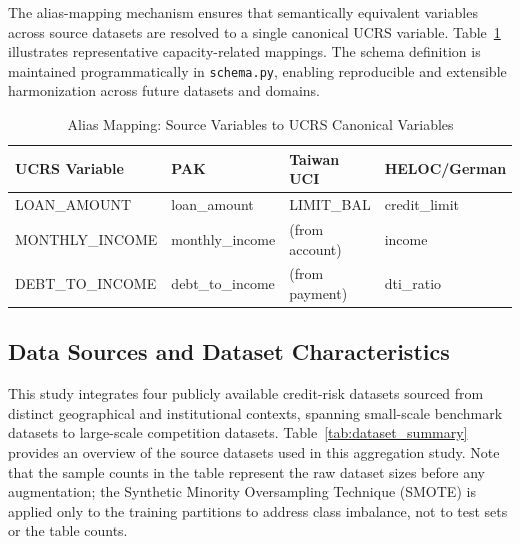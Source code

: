 \documentclass[onecolumn]{IEEEtai}
\begin{document}
The alias-mapping mechanism ensures that semantically equivalent variables across source datasets are resolved to a single canonical UCRS variable. Table~\ref{tab:alias_example} illustrates representative capacity-related mappings. The schema definition is maintained programmatically in \texttt{schema.py}, enabling reproducible and extensible harmonization across future datasets and domains.

\begin{table}[!htbp]
\centering
\small
\caption{Alias Mapping: Source Variables to UCRS Canonical Variables}
\label{tab:alias_example}
\begin{tabular}{llll}
\toprule
\textbf{UCRS Variable} & \textbf{PAK} & \textbf{Taiwan UCI} & \textbf{HELOC/German} \\
\midrule
LOAN\_AMOUNT     & loan\_amount   & LIMIT\_BAL      & credit\_limit \\
MONTHLY\_INCOME  & monthly\_income & (from account) & income \\
DEBT\_TO\_INCOME & debt\_to\_income & (from payment) & dti\_ratio \\
\bottomrule
\end{tabular}
\end{table}

\subsection{Data Sources and Dataset Characteristics}\vspace{-2pt}

This study integrates four publicly available credit-risk datasets sourced from distinct geographical and institutional contexts, spanning small-scale benchmark datasets to large-scale competition datasets. Table~\ref{tab:dataset_summary} provides an overview of the source datasets used in this aggregation study. Note that the sample counts in the table represent the raw dataset sizes before any augmentation; the Synthetic Minority Oversampling Technique (SMOTE) is applied only to the training partitions to address class imbalance, not to test sets or the table counts.
\end{document}

